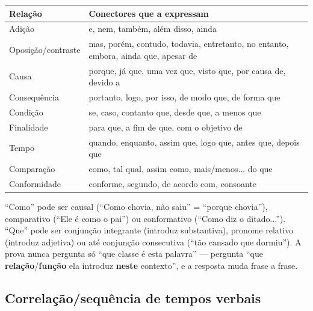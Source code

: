 \begin{center}
\begin{tabular}{@{}p{2.6cm}p{9.4cm}@{}}
\toprule
\textbf{Relação} & \textbf{Conectores que a expressam} \\
\midrule
Adição & e, nem, também, além disso, ainda \\
Oposição/contraste & mas, porém, contudo, todavia, entretanto, no entanto,
embora, ainda que, apesar de \\
Causa & porque, já que, uma vez que, visto que, por causa de, devido a \\
Consequência & portanto, logo, por isso, de modo que, de forma que \\
Condição & se, caso, contanto que, desde que, a menos que \\
Finalidade & para que, a fim de que, com o objetivo de \\
Tempo & quando, enquanto, assim que, logo que, antes que, depois que \\
Comparação & como, tal qual, assim como, mais/menos... do que \\
Conformidade & conforme, segundo, de acordo com, consoante \\
\bottomrule
\end{tabular}
\end{center}

\begin{cuidado}
“Como” pode ser causal (“Como chovia, não saiu” = “porque chovia”),
comparativo (“Ele é como o pai”) ou conformativo (“Como diz o ditado...”).
“Que” pode ser conjunção integrante (introduz substantiva), pronome relativo
(introduz adjetiva) ou até conjunção consecutiva (“tão cansado que
dormiu”). A prova nunca pergunta só “que classe é esta palavra” --- pergunta
“que \textbf{relação}/\textbf{função} ela introduz \textbf{neste}
contexto”, e a resposta muda frase a frase.
\end{cuidado}

\subsection{Correlação/sequência de tempos verbais}
\label{sec:correlacao}

